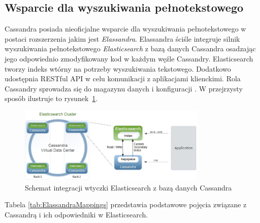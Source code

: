 \subsection{Wsparcie dla wyszukiwania pełnotekstowego}

Cassandra posiada nieoficjalne wsparcie dla wyszukiwania pełnotekstowego w postaci rozszerzenia jakim jest \textit{Elassandra}.
Elassandra ściśle integruje silnik wyszukiwania pełnotekstowego \textit{Elasticsearch} z bazą danych Cassandra osadzając jego odpowiednio zmodyfikowany kod w każdym węźle Cassandry.
Elasticsearch tworzy indeks wtórny na potrzeby wyszukiwania tekstowego.
Dodatkowo udostępnia RESTful API w celu komunikacji z aplikacjami klienckimi. 
Rola Cassandry sprowadza się do magazynu danych i konfiguracji \cite{elassandraArchitecture}.
W przejrzysty sposób ilustruje to rysunek~\ref{fig:elassandraSchema}.

\begin{figure}[!ht]
\centering
\includegraphics[width=0.8\textwidth]{figures/elassandra1.jpg}
\caption{Schemat integracji wtyczki Elasticsearch z bazą danych Cassandra \cite{ElassandraRepo}}
\label{fig:elassandraSchema}
\end{figure}

Tabela \ref{tab:ElassandraMappings} przedstawia podstawowe pojęcia związane z Cassandrą i ich odpowiedniki w Elasticsearch.

